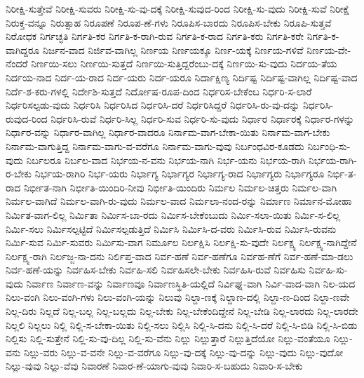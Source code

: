 {ನಿರೀಕ್ಷಿ-ಸುತ್ತೇವೆ
ನಿರೀಕ್ಷಿ-ಸುವರು
ನಿರೀಕ್ಷಿ-ಸು-ವು-ದಕ್ಕೆ
ನಿರೀಕ್ಷಿ-ಸುವುದ-ರಿಂದ
ನಿರೀಕ್ಷಿ-ಸು-ವುದು
ನಿರೀಕ್ಷಿ-ಸುವೆ
ನಿರೀಕ್ಷೆ
ನಿರುಕ್ತ-ವನ್ನೂ
ನಿರುತ್ಸಾಹ
ನಿರೂಪಣೆ
ನಿರೂಪ-ಣೆ-ಗಳು
ನಿರೂಪಿಸ-ಬಾರದು
ನಿರೂಪಿಸ-ಬೇಕು
ನಿರೂಪಿ-ಸುತ್ತವೆ
ನಿರೋಧಕ
ನಿರ್ಗಚ್ಛತಿ
ನಿರ್ಗತಿ-ಕರ
ನಿರ್ಗತಿ-ಕ-ರಾಗಿ-ರುವ
ನಿರ್ಗತಿ-ಕ-ರಾದ
ನಿರ್ಗತಿ-ಕರು
ನಿರ್ಗತಿ-ಕರೇ
ನಿರ್ಗತಿ-ಕ-ವಾಗಿದ್ದರೂ
ನಿರ್ಜನ-ವಾದ
ನಿರ್ಜಿವ-ವಾಗಿಲ್ಲ
ನಿರ್ಣಯ
ನಿರ್ಣಯಕ್ಕೂ
ನಿರ್ಣ-ಯಕ್ಕೆ
ನಿರ್ಣಯ-ಗಳಿವೆ
ನಿರ್ಣಯ-ವೇ-ನೆಂದರೆ
ನಿರ್ಣಯಿ-ಸಲು
ನಿರ್ಣಯಿ-ಸುತ್ತದೆ
ನಿರ್ಣಯಿ-ಸುತ್ತಿದ್ದರೆಂಬು-ದಕ್ಕೆ
ನಿರ್ಣಯಿ-ಸು-ವುದು
ನಿರ್ದಯ-ತೆಯ
ನಿರ್ದಯ-ನಾದ
ನಿರ್ದ-ಯ-ರಾದ
ನಿರ್ದ-ಯರು
ನಿರ್ದ-ಯರೂ
ನಿರ್ದಾಕ್ಷಿಣ್ಯ
ನಿರ್ದಿಷ್ಟ
ನಿರ್ದಿಷ್ಟ-ವಾಗಿಲ್ಲ
ನಿರ್ದಿಷ್ಟ-ವಾದ
ನಿರ್ದೆ-ಶ-ಕರು-ಗಳಲ್ಲಿ
ನಿರ್ದೇಶಿ-ಸುತ್ತದೆ
ನಿರ್ದೋಷ-ರೂಪ-ದಿಂದ
ನಿರ್ಧರಿಸ-ಬೇಕೆಂಬ
ನಿರ್ಧರಿ-ಸ-ಲಾರೆ
ನಿರ್ಧರಿಸಲ್ಪಡು-ವುದು
ನಿರ್ಧರಿಸಿ
ನಿರ್ಧರಿಸಿದ
ನಿರ್ಧರಿಸಿ-ದರೆ
ನಿರ್ಧರಿಸಿದ್ದರೆ
ನಿರ್ಧರಿಸಿ-ರು-ವು-ದನ್ನು
ನಿರ್ಧರಿಸಿ-ರುವುದ-ರಿಂದ
ನಿರ್ಧರಿಸಿ-ರುವೆ
ನಿರ್ಧರಿ-ಸಿಲ್ಲ
ನಿರ್ಧರಿ-ಸುವ
ನಿರ್ಧರಿ-ಸು-ವುದು
ನಿರ್ಧಾರ
ನಿರ್ಧಾರಕ್ಕೆ
ನಿರ್ಧಾರ-ಗಳನ್ನು
ನಿರ್ಧಾರ-ವನ್ನು
ನಿರ್ಧಾರ-ವಾಗಿಲ್ಲ
ನಿರ್ಧಾರ-ವಾದರೂ
ನಿರ್ನಾಮ-ವಾಗ-ಬೇಕಾ-ಯಿತು
ನಿರ್ನಾಮ-ವಾಗ-ಬೇಕು
ನಿರ್ನಾಮ-ವಾಗುತ್ತಿದ್ದ
ನಿರ್ನಾಮ-ವಾಗು-ವ-ವರೆಗೂ
ನಿರ್ನಾಮ-ವಾಗು-ವುವು
ನಿರ್ಬಂಧವಿರ-ಕೂಡದು
ನಿರ್ಬಂಧಿ-ಸು-ವುದು
ನಿರ್ಬಲರೂ
ನಿರ್ಬಲ-ವಾದ
ನಿರ್ಭಯ-ನ-ವನು
ನಿರ್ಭಯ-ನಾಗಿ
ನಿರ್ಭ-ಯನು
ನಿರ್ಭಯ-ರಾಗಿ
ನಿರ್ಭಯ-ರಾಗಿ-ರ-ಬೇಕು
ನಿರ್ಭಯ-ರಾಗಿರಿ
ನಿರ್ಭ-ಯರು
ನಿರ್ಭಾಗ್ಯ
ನಿರ್ಭಾಗ್ಯರ
ನಿರ್ಭಾಗ್ಯ-ರಾದ
ನಿರ್ಭಾಗ್ಯರು
ನಿರ್ಭಾಗ್ಯರೂ
ನಿರ್ಭಿ-ತ-ರಾದ
ನಿರ್ಭೀತ-ನಾಗಿ
ನಿರ್ಭೀತಿ-ಯಿಂದಿರಿ-ನೀವು
ನಿರ್ಭೀತಿ-ಯಿಂದಿರು
ನಿರ್ಮಲ
ನಿರ್ಮಲ-ಚಿತ್ತರು
ನಿರ್ಮಲ-ವಾಗಿ
ನಿರ್ಮಲ-ವಾಗಿದೆ
ನಿರ್ಮಲ-ವಾಗಿ-ರು-ವುದು
ನಿರ್ಮಲ-ವಾದ
ನಿರ್ಮಲಾ-ನಂದ-ರನ್ನು
ನಿರ್ಮಾಣ
ನಿರ್ಮಾನ-ಮೋಹಾ
ನಿರ್ಮಿತ-ವಾಗ-ಲಿಲ್ಲ
ನಿರ್ಮಿತಾ
ನಿರ್ಮಿಸ-ಬಾ-ರದು
ನಿರ್ಮಿಸ-ಬೇಕೆಂಬುದು
ನಿರ್ಮಿ-ಸಲಾ-ಯಿತು
ನಿರ್ಮಿ-ಸ-ಲಿಲ್ಲ
ನಿರ್ಮಿ-ಸಲು
ನಿರ್ಮಿಸಲ್ಪಟ್ಟಿದೆ
ನಿರ್ಮಿಸಲ್ಪಡುತ್ತಿದೆ
ನಿರ್ಮಿಸಿ
ನಿರ್ಮಿಸಿ-ದ-ವರು
ನಿರ್ಮಿಸಿ-ರುವ
ನಿರ್ಮಿಸಿ-ರುವನು
ನಿರ್ಮಿ-ಸುವ
ನಿರ್ಮಿ-ಸುವರು
ನಿರ್ಮಿಸು-ವಾಗ
ನಿರ್ಮೂಲ
ನಿರ್ಲಕ್ಷಿಸಿ
ನಿರ್ಲಕ್ಷಿ-ಸು-ವುದೇ
ನಿರ್ಲಕ್ಷ್ಯ
ನಿರ್ಲಕ್ಷ್ಯ-ನಾಗಿದ್ದೇನೆ
ನಿರ್ಲಕ್ಷ್ಯ-ರಾಗಿ
ನಿರ್ಲಜ್ಜ-ನಾ-ದನು
ನಿರ್ಲಿಪ್ತ-ವಾದ
ನಿರ್ವ-ಹಣೆ
ನಿರ್ವ-ಹಣೆಗೂ
ನಿರ್ವಹ-ಣೆಗೆ
ನಿರ್ವ-ಹಣೆ-ಮಾ-ಡಲು
ನಿರ್ವ-ಹಣೆ-ಯನ್ನು
ನಿರ್ವಹಿಸ-ಬೇಕು
ನಿರ್ವಹಿ-ಸಲಿ
ನಿರ್ವಹಿಸಲೇ-ಬೇಕು
ನಿರ್ವಹಿಸಿ-ರುವೆ
ನಿರ್ವಹಿಸು
ನಿರ್ವಹಿ-ಸು-ವುದು
ನಿರ್ವಾಣ
ನಿರ್ವಾಣ-ವನ್ನು
ನಿರ್ವಾಣವೂ
ನಿರ್ವಾಣಸ್ಥಿತಿ-ಯಲ್ಲಿದೆ
ನಿರ್ವಿಘ್ನ-ವಾಗಿ
ನಿರ್ವಿ-ವಾದ-ವಾಗಿ
ನಿಲ-ಯದ
ನಿಲು-ವಂಗಿ
ನಿಲು-ವಂಗಿ-ಗಳು
ನಿಲು-ವಂಗಿ-ಯನ್ನು
ನಿಲುವು
ನಿಲ್ದಾ-ಣಕ್ಕೆ
ನಿಲ್ದಾಣ-ದಲ್ಲಿ
ನಿಲ್ದಾ-ಣ-ದಿಂದ
ನಿಲ್ದಾ-ಣವೇ
ನಿಲ್ಲ-ದಿರು
ನಿಲ್ಲದೆ
ನಿಲ್ಲ-ಬಲ್ಲ
ನಿಲ್ಲ-ಬಲ್ಲದು
ನಿಲ್ಲ-ಬೇಕು
ನಿಲ್ಲ-ಬೇಕೆಂದಿದ್ದೇನೆ
ನಿಲ್ಲ-ಬೇಡಿ
ನಿಲ್ಲ-ಲಾರದು
ನಿಲ್ಲ-ಲಾರದೇ
ನಿಲ್ಲಲಿ
ನಿಲ್ಲಲು
ನಿಲ್ಲಿ
ನಿಲ್ಲಿ-ಸ-ಬೇಕಾ-ಯಿತು
ನಿಲ್ಲಿ-ಸಲು
ನಿಲ್ಲಿಸಿ
ನಿಲ್ಲಿ-ಸಿ-ದನು
ನಿಲ್ಲಿ-ಸಿ-ದರೆ
ನಿಲ್ಲಿ-ಸಿ-ಬಿಡಿ
ನಿಲ್ಲಿ-ಸಿ-ಬಿಡು
ನಿಲ್ಲಿಸು
ನಿಲ್ಲಿ-ಸುತ್ತೇನೆ
ನಿಲ್ಲಿ-ಸು-ವು-ದಿಲ್ಲ
ನಿಲ್ಲಿ-ಸು-ವೆನು
ನಿಲ್ಲು
ನಿಲ್ಲುತ್ತಾರೆ
ನಿಲ್ಲುತ್ತಿದೆಯೋ
ನಿಲ್ಲು-ವಂತೆಯೂ
ನಿಲ್ಲು-ವನು
ನಿಲ್ಲು-ವರು
ನಿಲ್ಲು-ವ-ವನೇ
ನಿಲ್ಲು-ವ-ವರೆಗೂ
ನಿಲ್ಲು-ವು-ದಕ್ಕೆ
ನಿಲ್ಲು-ವು-ದನ್ನು
ನಿಲ್ಲು-ವುದು
ನಿಲ್ಲು-ವುದೋ
ನಿಲ್ಲು-ವುವು
ನಿಲ್ಲು-ವೆವು
ನಿವಾರಣೆ
ನಿವಾರ-ಣೆ-ಯಾಗು-ವುವು
ನಿವಾರಿ-ಸ-ಬಹುದು
ನಿವಾರಿ-ಸ-ಬೇಕು
}
